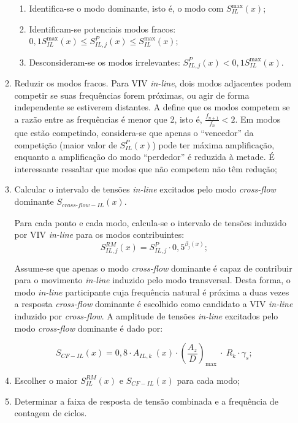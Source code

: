 \begin{itemize}
\begin{enumerate}
\begin{enumerate}
    	\item Identifica-se o modo dominante, isto é, o modo com $S_\mathit{IL}^{\max}(x)$;

    	\item Identificam-se potenciais modos fracos: $0,1 S_\mathit{IL}^{\max}(x) \leq S_{\mathit{IL}, \mathit{j}}^{P}(x) \leq S_\mathit{IL}^{\max}(x)$;

    	\item Desconsideram-se os modos irrelevantes: $S_{\mathit{IL}, \mathit{j}}^{P}(x) < 0,1 S_\mathit{IL}^{\max}(x)$.
    \end{enumerate}

        \item Reduzir os modos fracos.
        Para VIV \textit{in-line}, dois modos adjacentes podem competir se suas frequências forem próximas, ou agir de forma independente se estiverem distantes.
        A  define que os modos competem se a razão entre as frequências é menor que 2, isto é, $\frac{f_\mathit{n+1}}{f_n} < 2$.
        Em modos que estão competindo, considera-se que apenas o ``vencedor'' da competição (maior valor de $S_{\mathit{IL}}^{P}(x)$) pode ter máxima amplificação, enquanto a amplificação do modo ``perdedor'' é reduzida à metade. É interessante ressaltar que modos que não competem não têm redução;

        \item Calcular o intervalo de tensões \textit{in-line} excitados pelo modo \textit{cross-flow} dominante $S_{\mathit{\textit{cross-flow}}-\mathit{IL}}(x)$.

        Para cada ponto e cada modo, calcula-se o intervalo de tensões induzido por VIV \textit{in-line} para os modos contribuintes:
            \[S_{\mathit{IL}, \mathit{j}}^\mathit{RM}(x) = S_{\mathit{IL}, \mathit{j}}^{P} \cdot 0,5^{\beta_j (x)};\]

        Assume-se que apenas o modo \textit{cross-flow} dominante é capaz de contribuir para o movimento \textit{in-line} induzido pelo modo transversal.
        Desta forma, o modo \textit{in-line} participante cuja frequência natural é próxima a duas vezes a resposta \textit{cross-flow} dominante é escolhido como candidato a VIV \textit{in-line} induzido por \textit{cross-flow}. A amplitude de tensões \textit{in-line} excitados pelo modo \textit{cross-flow} dominante é dado por:

       	    \[S_{\mathit{CF-IL}}(x) = 0,8 \cdot A_{\mathit{IL}, \mathit{k}}~(x) \cdot {\left(\frac{A_{z}}{D}\right)}_{\max}~\cdot~R_k \cdot \gamma_s;\]

        \item  Escolher o maior $S_\mathit{IL}^\mathit{RM}(x)$ e $S_{\mathit{CF-IL}}(x)$ para cada modo;

        \item Determinar a faixa de resposta de tensão combinada e a frequência de contagem de ciclos.
    \end{enumerate}

\end{itemize}
